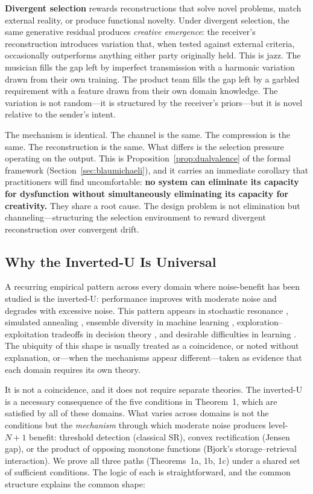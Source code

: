 \documentclass[12pt,letterpaper]{article}
\theoremstyle{definition}
\theoremstyle{remark}
\begin{document}
\textbf{Divergent selection} rewards reconstructions that solve novel problems, match external reality, or produce functional novelty. Under divergent selection, the same generative residual produces \emph{creative emergence}: the receiver's reconstruction introduces variation that, when tested against external criteria, occasionally outperforms anything either party originally held. This is jazz. The musician fills the gap left by imperfect transmission with a harmonic variation drawn from their own training. The product team fills the gap left by a garbled requirement with a feature drawn from their own domain knowledge. The variation is not random---it is structured by the receiver's priors---but it is novel relative to the sender's intent.

The mechanism is identical. The channel is the same. The compression is the same. The reconstruction is the same. What differs is the selection pressure operating on the output. This is Proposition~\ref{prop:dualvalence} of the formal framework (Section~\ref{sec:blaumichaeli}), and it carries an immediate corollary that practitioners will find uncomfortable: \textbf{no system can eliminate its capacity for dysfunction without simultaneously eliminating its capacity for creativity.} They share a root cause. The design problem is not elimination but channeling---structuring the selection environment to reward divergent reconstruction over convergent drift.


\subsection{Why the Inverted-U Is Universal}

A recurring empirical pattern across every domain where noise-benefit has been studied is the inverted-U\@: performance improves with moderate noise and degrades with excessive noise. This pattern appears in stochastic resonance \citep{gammaitoni1998}, simulated annealing \citep{kirkpatrick1983}, ensemble diversity in machine learning \citep{krogh1994}, exploration--exploitation tradeoffs in decision theory \citep{sutton2018}, and desirable difficulties in learning \citep{bjork2011}. The ubiquity of this shape is usually treated as a coincidence, or noted without explanation, or---when the mechanisms appear different---taken as evidence that each domain requires its own theory.

It is not a coincidence, and it does not require separate theories. The inverted-U is a necessary consequence of the five conditions in Theorem~1, which are satisfied by all of these domains. What varies across domains is not the conditions but the \emph{mechanism} through which moderate noise produces level-$N{+}1$ benefit: threshold detection (classical SR), convex rectification (Jensen gap), or the product of opposing monotone functions (Bjork's storage--retrieval interaction). We prove all three paths (Theorems~1a, 1b, 1c) under a shared set of sufficient conditions. The logic of each is straightforward, and the common structure explains the common shape:
\end{document}
